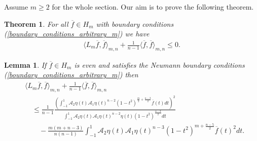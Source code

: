 \documentclass[12pt,twoside]{amsart}
\numberwithin{satz}{section}
\newtheorem{theorem}[satz]{Theorem}
\newtheorem{lemma}[satz]{Lemma}
\theoremstyle{definition}
\numberwithin{equation}{section}
\begin{document}
	Assume $m\geq 2$ for the whole section. Our aim is to prove the following theorem.
	
	\begin{theorem}\label{theorem_m>1}
		For all $\overline{f}\in H_m$ with boundary conditions (\ref{boundary_conditions_arbitrary_m}) we have
		\begin{align*}
			\langle L_m\overline{f},\overline{f}\rangle_{m,n}+\frac{1}{n-1}\langle \overline{f},\overline{f}\rangle_{m,n}\leq 0.
		\end{align*}
	\end{theorem}
	
	\begin{lemma}\label{even_case}
		If $\overline{f} \in H_m$ is even and satisfies the Neumann boundary conditions (\ref{boundary_conditions_arbitrary_m}) then
		\begin{align*}
			& \langle L_m\overline{f},\overline{f}\rangle_{m,n} + \frac{1}{n-1}\langle \overline{f},\overline{f}\rangle_{m,n} \nonumber \\ 
			& \quad \leq \frac{1}{n-1}\frac{\left(\int_{-1}^1 \mathcal{A}_2\eta(t)\mathcal{A}_1\eta(t)^{n-2}(1-t^2)^{\frac{m}{2}+\frac{n-3}{2}} \overline{f}(t)dt\right)^2}{\int_{-1}^1 \mathcal{A}_2\eta(t)\mathcal{A}_1\eta(t)^{n-2}\eta(t)(1-t^2)^{\frac{n-3}{2}}dt} \\
			& \quad \quad -\frac{m(m+n-3)}{n(n-1)}\int_{-1}^1 \mathcal{A}_2\eta(t)\mathcal{A}_1\eta(t)^{n-3}(1-t^2)^{m+\frac{n-5}{2}} \overline{f}(t)^2dt. \nonumber
		\end{align*}
	\end{lemma}
	
\end{document}
